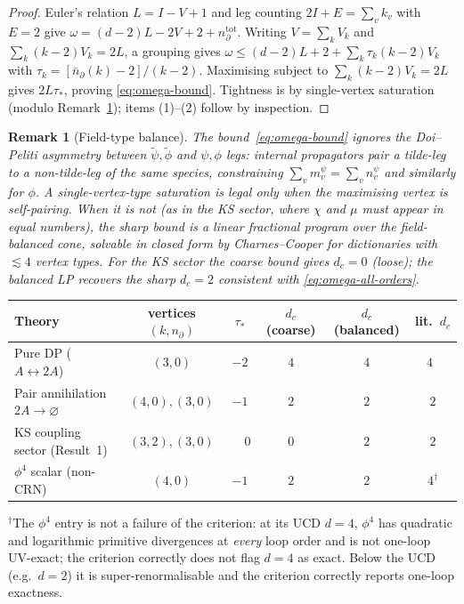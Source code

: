 \documentclass[11pt,a4paper]{article}
\newcommand{\psit}{\tilde\psi}
\newcommand{\phit}{\tilde\phi}
\theoremstyle{plain}
\newtheorem{remark}[theorem]{Remark}
\begin{document}
\begin{proof}
Euler's relation $L = I - V + 1$ and leg counting $2I + E = \sum_v k_v$
with $E = 2$ give $\omega = (d-2)L - 2V + 2 + n_\partial^{\mathrm{tot}}$.
Writing $V = \sum_k V_k$ and $\sum_k (k-2)V_k = 2L$, a grouping
gives
$\omega \leq (d-2)L + 2 + \sum_k \tau_k (k-2) V_k$
with $\tau_k = [\bar n_\partial(k)-2]/(k-2)$.  Maximising subject
to $\sum_k (k-2) V_k = 2L$ gives $2L\tau_\ast$, proving
\eqref{eq:omega-bound}.  Tightness is by single-vertex
saturation (modulo Remark~\ref{rem:balance}); items (1)--(2) follow
by inspection.
\end{proof}

\begin{remark}[Field-type balance]
\label{rem:balance}
The bound~\eqref{eq:omega-bound} ignores the Doi--Peliti
asymmetry between $\psit,\phit$ and $\psi,\phi$ legs: internal
propagators pair a tilde-leg to a non-tilde-leg of the same
species, constraining $\sum_v m_v^\psi = \sum_v n_v^\psi$ and
similarly for $\phi$.  A single-vertex-type saturation is legal
only when the maximising vertex is \emph{self-pairing}.  When it
is not (as in the KS sector, where $\chi$ and $\mu$ must appear
in equal numbers), the sharp bound is a linear fractional program
over the field-balanced cone, solvable in closed form by
Charnes--Cooper for dictionaries with $\lesssim 4$ vertex types.
For the KS sector the coarse bound gives $d_c = 0$ (loose); the
balanced LP recovers the sharp $d_c = 2$ consistent with
\eqref{eq:omega-all-orders}.
\end{remark}

\begin{center}\small
\begin{tabular}{@{}lccccc@{}}\toprule
Theory & vertices $(k, n_\partial)$ & $\tau_\ast$
       & $d_c$ (coarse) & $d_c$ (balanced) & lit.\ $d_c$ \\ \midrule
Pure DP ($A\leftrightarrow 2A$) & $(3,0)$ & $-2$ & $4$ & $4$ & $4$~\citep{Tauber}\\
Pair annihilation $2A\to\varnothing$ & $(4,0),(3,0)$ & $-1$ & $2$ & $2$ & $2$\\
KS coupling sector (Result~1) & $(3,2),(3,0)$ & $\phantom{-}0$ & $0$ & $2$ & $2$\\
$\phi^4$ scalar (non-CRN) & $(4,0)$ & $-1$ & $2$ & $2$ & $4^\dagger$\\
\bottomrule\end{tabular}
\end{center}
\noindent$^\dagger$The $\phi^4$ entry is not a failure of the
criterion: at its UCD $d=4$, $\phi^4$ has quadratic and
logarithmic primitive divergences at \emph{every} loop order and
is not one-loop UV-exact; the criterion correctly does not flag
$d = 4$ as exact.  Below the UCD (e.g.\ $d = 2$) it is
super-renormalisable and the criterion correctly reports
one-loop exactness.
\end{document}
